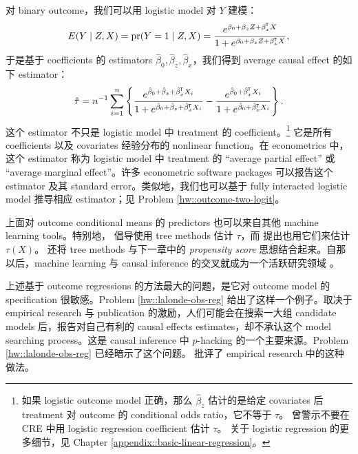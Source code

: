  \begin{example}
 \label{eg::reg-binary}
 对 binary outcome，我们可以用 logistic model 对 $Y$ 建模：
$$
E(Y\mid Z, X) = \textup{pr}(Y =1\mid Z, X) = \frac{   e^{\beta_0 + \beta_z Z + \beta_x ^{\mkern-1.5mu\mathsf{T}} X}  }
{ 1+ e^{\beta_0 + \beta_z Z + \beta_x ^{\mkern-1.5mu\mathsf{T}} X} } ,
$$
于是基于 coefficients 的 estimators $ \hat \beta_0, \hat \beta_z, \hat{\beta}_x $，我们得到 average causal effect 的如下 estimator：
$$
\hat{\tau} = n^{-1} \sum_{i=1}^n \left\{  
\frac{   e^{\hat\beta_0 +\hat \beta_z + \hat\beta_x ^{\mkern-1.5mu\mathsf{T}} X_i}  }
{ 1+ e^{\hat\beta_0 +\hat \beta_z  + \hat\beta_x ^{\mkern-1.5mu\mathsf{T}} X_i} }  
- \frac{   e^{\hat\beta_0 + \hat\beta_x ^{\mkern-1.5mu\mathsf{T}} X_i}  }
{ 1+ e^{\hat\beta_0   + \hat\beta_x ^{\mkern-1.5mu\mathsf{T}} X_i} } 
\right \}  . 
$$
这个 estimator 不只是 logistic model 中 treatment 的 coefficient。\footnote{如果 logistic outcome model 正确，那么 $\hat\beta_z$ 估计的是给定 covariates 后 treatment 对 outcome 的 conditional odds ratio，它不等于 $\tau$。
\citet{freedman2008randomization} 曾警示不要在 CRE 中用 logistic regression coefficient 估计 $\tau$。
关于 logistic regression 的更多细节，见 Chapter \ref{appendix::basic-linear-regression}。} 它是所有 coefficients 以及 covariates 经验分布的 nonlinear function。在 econometrics 中，这个 estimator 称为 logistic model 中 treatment 的 ``average partial effect'' 或 ``average marginal effect''。许多 econometric software packages 可以报告这个 estimator 及其 standard error。类似地，我们也可以基于 fully interacted logistic model 推导相应 estimator；见 Problem \ref{hw::outcome-two-logit}。 
 \end{example}





 

上面对 outcome conditional means 的 predictors 也可以来自其他 machine learning tools。特别地，\citet{hill2011bayesian} 倡导使用 tree methods 估计 $\tau$，而 \citet{wager2018estimation} 提出也用它们来估计 $\tau(X) $。\citet{wager2018estimation} 还将 tree methods 与下一章中的 {\it propensity score} 思想结合起来。自那以后，machine learning 与 causal inference 的交叉就成为一个活跃研究领域 \citep[e.g.,][]{hahn2020bayesian, kunzel2019metalearners}。 


上述基于 outcome regressions 的方法最大的问题，是它对 outcome model 的 specification 很敏感。Problem \ref{hw::lalonde-obs-reg} 给出了这样一个例子。取决于 empirical research 与 publication 的激励，人们可能会在搜索一大组 candidate models 后，报告对自己有利的 causal effects estimates，却不承认这个 model searching process。这是 causal inference 中 $p$-hacking 的一个主要来源。Problem \ref{hw::lalonde-obs-reg} 已经暗示了这个问题。\citet{leamer1978specification} 批评了 empirical research 中的这种做法。  

